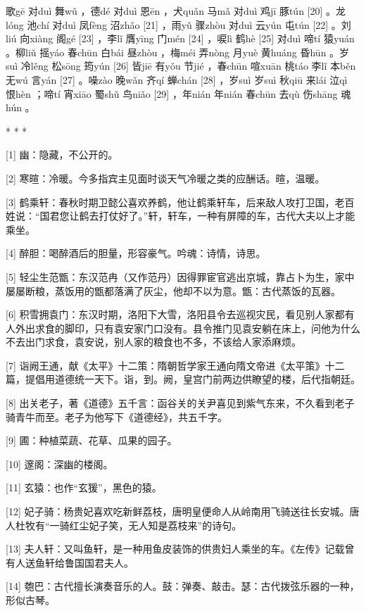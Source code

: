 \documentclass[12pt,UTF8]{ctexbook}
\begin{document}
歌gē 对duì 舞wǔ ，德dé 对duì 恩ēn ，犬quǎn 马mǎ 对duì 鸡jī 豚tún [20] 。龙lóng 池chí 对duì 凤fèng 沼zhǎo [21] ，雨yǔ 骤zhòu 对duì 云yún 屯tún [22] 。刘liú 向xiàng 阁gé [23] ，李lǐ 膺yīng 门mén [24] ，唳lì 鹤hè [25] 对duì 啼tí 猿yuán 。柳liǔ 摇yáo 春chūn 白bái 昼zhòu ，梅méi 弄nòng 月yuè 黄huáng 昏hūn 。岁suì 冷lěng 松sōng 筠yún [26] 皆jiē 有yǒu 节jié ，春chūn 喧xuān 桃táo 李lǐ 本běn 无wú 言yán [27] 。噪zào 晚wǎn 齐qí 蝉chán [28] ，岁suì 岁suì 秋qiū 来lái 泣qì 恨hèn ；啼tí 宵xiāo 蜀shǔ 鸟niǎo [29] ，年nián 年nián 春chūn 去qù 伤shāng 魂hún 。



* * *



[1] 幽：隐藏，不公开的。

[2] 寒暄：冷暖。今多指宾主见面时谈天气冷暖之类的应酬话。暄，温暖。

[3] 鹤乘轩：春秋时期卫懿公喜欢养鹤，他让鹤乘轩车，后来敌人攻打卫国，老百姓说：“国君您让鹤去打仗好了。”轩，轩车，一种有屏障的车，古代大夫以上才能乘坐。

[4] 醉胆：喝醉酒后的胆量，形容豪气。吟魂：诗情，诗思。

[5] 轻尘生范甑：东汉范冉（又作范丹）因得罪宦官逃出京城，靠占卜为生，家中屡屡断粮，蒸饭用的甑都落满了灰尘，他却不以为意。甑：古代蒸饭的瓦器。

[6] 积雪拥袁门：东汉时期，洛阳下大雪，洛阳县令去巡视灾民，看见别人家都有人外出求食的脚印，只有袁安家门口没有。县令推门见袁安躺在床上，问他为什么不去出门求食，袁安说，别人家的粮食也不多，不该给人家添麻烦。

[7] 诣阙王通，献《太平》十二策：隋朝哲学家王通向隋文帝进《太平策》十二篇，提倡用道德统一天下。诣，到。阙，皇宫门前两边供瞭望的楼，后代指朝廷。

[8] 出关老子，著《道德》五千言：函谷关的关尹喜见到紫气东来，不久看到老子骑青牛而至。老子为他写下《道德经》，共五千字。

[9] 圃：种植菜蔬、花草、瓜果的园子。

[10] 邃阁：深幽的楼阁。

[11] 玄猿：也作“玄猨”，黑色的猿。

[12] 妃子骑：杨贵妃喜欢吃新鲜荔枝，唐明皇便命人从岭南用飞骑送往长安城。唐人杜牧有“一骑红尘妃子笑，无人知是荔枝来”的诗句。

[13] 夫人轩：又叫鱼轩，是一种用鱼皮装饰的供贵妇人乘坐的车。《左传》记载曾有人送鱼轩给鲁国国君夫人。

[14] 匏巴：古代擅长演奏音乐的人。鼓：弹奏、敲击。瑟：古代拨弦乐器的一种，形似古琴。
\end{document}
